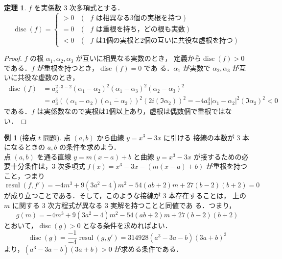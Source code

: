 \documentclass[12pt, uplatex, dvipdfmx]{jsarticle}
\theoremstyle{definition}
\newtheorem{theorem}{定理}
\newtheorem{example}{例}
\DeclareMathOperator{\resul}{resul}
\DeclareMathOperator{\disc}{disc}
\begin{document}
\begin{theorem}
  $f$ を実係数 $3$ 次多項式とする．
  \[
    \disc (f) =
    \begin{cases}
      >0 & (\text{ $f$ は相異なる3個の実根を持つ})\\
      =0 & (\text{ $f$ は重根を持ち，どの根も実数})\\
      <0 & (\text{ $f$ は1個の実根と2個の互いに共役な虚根を持つ})
    \end{cases}
  \]
\end{theorem}

\begin{proof}
  $f$ の根 $\alpha_1, \alpha_2, \alpha_3$ が互いに相異なる実数のとき，
  定義から$\disc(f) >0$ である．$f$ が重根を持つとき，$\disc(f)=0$ であ
  る．$\alpha_1$ が実数で $\alpha_2, \alpha_3$ が互いに共役な虚数のとき，
  \[
    \begin{aligned}
      \disc(f) &= a_3^{2\cdot 3-2} (\alpha_1-\alpha_2)^2(\alpha_1-\alpha_3)^2(\alpha_2-\alpha_3)^2\\
      &=a_3^{4}\left( \left( \alpha_1 - \alpha_2\right)\left(\overline{\alpha_1-\alpha_2}\right)\right)^2
      \left( 2 i \left(\Im \alpha_2\right)\right)^2
      = -4 a_3^{4} \left| \alpha_1-\alpha_2\right|^2 \left( \Im \alpha_2\right)^2 <0
    \end{aligned}
  \]
  である．$f$ は実係数なので実根は1個以上あり，虚根は偶数個で重根ではない．
\end{proof}


\begin{example}[接点 $t$ 問題] 点 $(a,b)$ から曲線 $y=x^3-3x$ に引ける
  接線の本数が $3$ 本になるときの $a,b$ の条件を求めよう．\\

  点 $(a,b)$ を通る直線 $y=m(x-a)+b$ と曲線 $y=x^3-3x$ が接するための必
  要十分条件は，$3$ 次多項式 $f(x) = x^3-3x - \left( m(x-a)+b\right)$
  が重根を持つこと，つまり
  \[
    \resul(f, f') = -4 m^{3}+9 \left(3 a^{2}-4\right) m^{2}-54 \left(a
      b +2\right) m +27 \left(b -2\right) \left(b +2\right)=0
  \]
  が成り立つことである．そして，このような接線が $3$ 本存在することは，
  上の $m$ に関する $3$ 次方程式が異なる $3$ 実解を持つことと同値であ
  る．つまり，
  \[
    g(m) = -4 m^{3}+9 \left(3 a^{2}-4\right) m^{2}-54 \left(a
      b +2\right) m +27 \left(b -2\right) \left(b +2\right)
  \]
  とおいて，$\disc(g)>0$ となる条件を求めればよい．
  \[
    \disc(g) = \frac{-1}{-4}\resul(g,g') = 314928 (a^3-3a-b)(3a+b)^3
  \]
  より，$(a^3-3a-b)(3a+b)>0$ が求める条件である．
\end{example}
\end{document}
